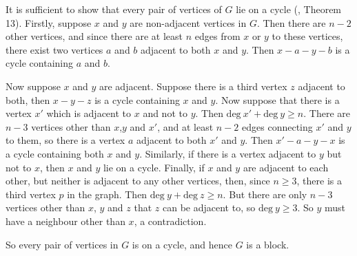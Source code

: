 It is sufficient to show that every pair of vertices of $G$ lie on a cycle
(\cite{notes}, Theorem 13). Firstly, suppose $x$ and $y$ are non-adjacent
vertices in $G$. Then there are $n-2$ other vertices, and since there are
at least $n$ edges from $x$ or $y$ to these vertices, there exist
two vertices $a$ and $b$ adjacent to both $x$ and $y$. Then $x-a-y-b$ is a
cycle containing $a$ and $b$.

Now suppose $x$ and $y$ are adjacent. Suppose there is a third vertex $z$
adjacent to both, then $x-y-z$ is a cycle containing $x$ and $y$.
Now suppose that there is a vertex $x'$ which is adjacent to $x$ and not
to $y$. Then $\text{deg}\ x'+\text{deg}\ y \ge n$. There are $n-3$ vertices
other than $x$,$y$ and $x'$, and at least $n-2$ edges connecting $x'$ and
$y$ to them, so there is a vertex $a$ adjacent to both $x'$ and $y$. Then
$x'-a-y-x$ is a cycle containing both $x$ and $y$. Similarly, if there is
a vertex adjacent to $y$ but not to $x$, then $x$ and $y$ lie on a cycle.
Finally, if $x$ and $y$ are adjacent to each other, but neither is adjacent
to any other vertices, then, since $n\ge 3$, there is a third vertex $p$
in the graph. Then $\text{deg}\ y+\text{deg}\ z \ge n$. But there are
only $n-3$ vertices other than $x$, $y$ and $z$ that $z$ can be adjacent
to, so $\text{deg}\ y \ge 3$. So $y$ must have a neighbour other than $x$,
a contradiction.

So every pair of vertices in $G$ is on a cycle, and hence $G$ is a block.
